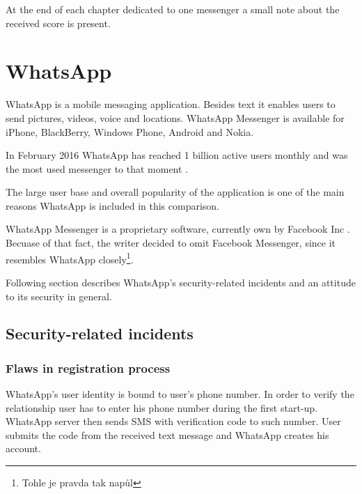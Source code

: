 \documentclass[thesis=M,english]{FITthesis}[2012/10/20]
\begin{document}
At the end of each chapter dedicated to one messenger a small note about the received score is present.

\section{WhatsApp}

WhatsApp is a mobile messaging application. Besides text it enables users to send pictures, videos, voice and locations. WhatsApp Messenger is available for iPhone, BlackBerry, Windows Phone, Android and Nokia\cite{whatsapphomepage}.

In February 2016 WhatsApp has reached 1 billion active users monthly and was the most used messenger to that moment \cite{whatsappusers}.

The large user base and overall popularity of the application is one of the main reasons WhatsApp is included in this comparison.

WhatsApp Messenger is a proprietary software, currently own by Facebook Inc \cite{facebookwhatsappbuy}. Becuase of that fact, the writer decided to omit Facebook Messenger, since it resembles WhatsApp closely\footnote{Tohle je pravda tak napůl}.

Following section describes WhatsApp's security-related incidents and an attitude to its security in general.

\subsection{Security-related incidents}

\subsubsection{Flaws in registration process}

WhatsApp's user identity is bound to user's phone number. In order to verify the relationship user has to enter his phone number during the first start-up. WhatsApp server then sends SMS with verification code to such number. User submits the code from the received text message and WhatsApp creates his account.  
\end{document}
